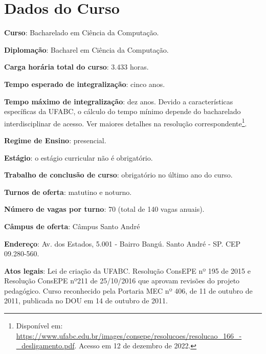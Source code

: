 \section{Dados do Curso}
\label{sec:dados_curso}

\textbf{Curso}: Bacharelado em Ciência da Computação.

\textbf{Diplomação}: Bacharel em Ciência da Computação.

\textbf{Carga horária total do curso}: 3.433 horas.

\textbf{Tempo esperado de integralização}: cinco anos.  

\textbf{Tempo máximo de integralização}: dez anos. Devido a características
específicas da UFABC, o cálculo do tempo mínimo depende do bacharelado
interdisciplinar de acesso. Ver maiores detalhes na resolução
correspondente\footnote{Disponível em:
\url{https://www.ufabc.edu.br/images/consepe/resolucoes/resolucao_166_-_desligamento.pdf}.
Acesso em 12 de dezembro de 2022.}.

\textbf{Regime de Ensino}: presencial.

\textbf{Estágio}: o estágio curricular não é obrigatório.

\textbf{Trabalho de conclusão de curso}: obrigatório no último ano do curso.

\textbf{Turnos de oferta}: matutino e noturno.

\textbf{Número de vagas por turno}: 70 (total de 140 vagas anuais).

\textbf{Câmpus de oferta}: Câmpus Santo André

\textbf{Endereço}: Av. dos Estados, 5.001 - Bairro Bangú. Santo André
- SP. CEP 09.280-560.

\textbf{Atos legais}: Lei de criação da UFABC. Resolução ConsEPE nº
195 de 2015 e Resolução ConsEPE nº211 de 25/10/2016 que aprovam
revisões do projeto pedagógico. Curso reconhecido pela Portaria MEC nº
406, de 11 de outubro de 2011, publicada no DOU em 14 de outubro de
2011.
